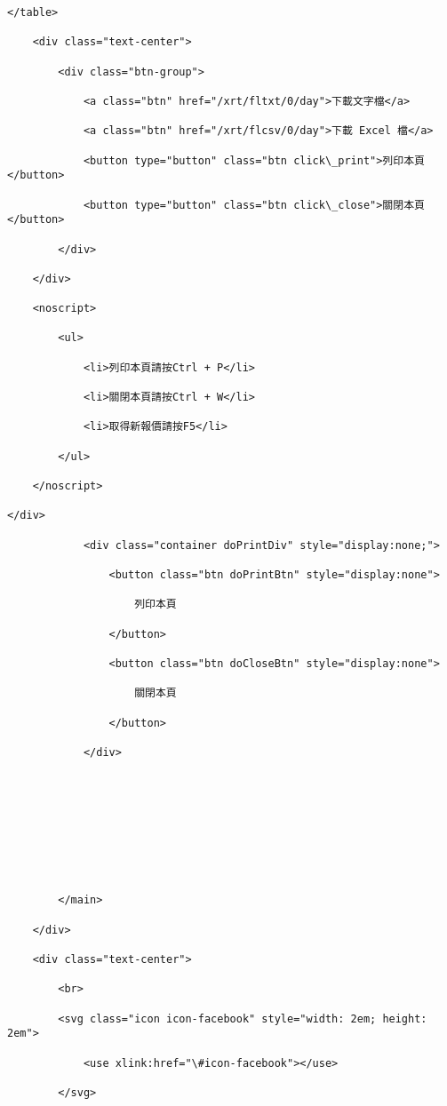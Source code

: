 \documentclass[11pt]{article}
\begin{document}
\begin{Verbatim}[commandchars=\\\{\}]
    </table>

    <div class="text-center">

        <div class="btn-group">

            <a class="btn" href="/xrt/fltxt/0/day">下載文字檔</a>

            <a class="btn" href="/xrt/flcsv/0/day">下載 Excel 檔</a>

            <button type="button" class="btn click\_print">列印本頁</button>

            <button type="button" class="btn click\_close">關閉本頁</button>

        </div>

    </div>

    <noscript>

        <ul>

            <li>列印本頁請按Ctrl + P</li>

            <li>關閉本頁請按Ctrl + W</li>

            <li>取得新報價請按F5</li>

        </ul>

    </noscript>

</div>

            <div class="container doPrintDiv" style="display:none;">

                <button class="btn doPrintBtn" style="display:none">

                    列印本頁

                </button>

                <button class="btn doCloseBtn" style="display:none">

                    關閉本頁

                </button>

            </div>

            

            



            

        </main>

    </div>

    <div class="text-center">

        <br>

        <svg class="icon icon-facebook" style="width: 2em; height: 2em">

            <use xlink:href="\#icon-facebook"></use>

        </svg>


\end{Verbatim}
\end{document}
